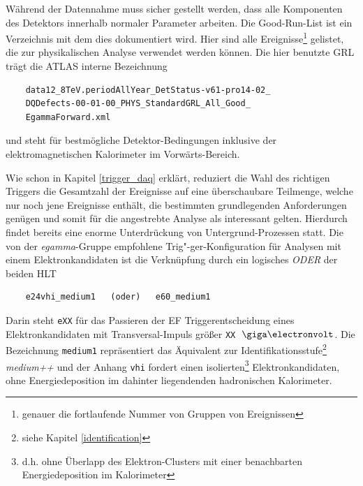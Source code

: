 \begin{description}
        Während der Datennahme muss sicher gestellt werden, dass alle
        Komponenten des Detektors innerhalb normaler Parameter arbeiten. Die
        Good-Run-List ist ein Verzeichnis mit dem dies dokumentiert wird. Hier
        sind alle Ereignisse\footnote{genauer die fortlaufende Nummer von
        Gruppen von Ereignissen} gelistet, die zur physikalischen Analyse
        verwendet werden können. Die hier benutzte \ac{GRL} trägt die ATLAS
        interne Bezeichnung
        \begin{verbatim}
    data12_8TeV.periodAllYear_DetStatus-v61-pro14-02_
    DQDefects-00-01-00_PHYS_StandardGRL_All_Good_
    EgammaForward.xml \end{verbatim}
        und steht für bestmögliche Detektor-Bedingungen inklusive der
        elektromagnetischen Kalorimeter im Vorwärts-Bereich.

\pagebreak

        Wie schon in Kapitel \ref{trigger_daq} erklärt, reduziert die Wahl des
        richtigen Triggers die Gesamtzahl der Ereignisse auf eine überschaubare
        Teilmenge, welche nur noch jene Ereignisse enthält, die bestimmten
        grundlegenden Anforderungen genügen und somit für die angestrebte
        Analyse als interessant gelten. Hierdurch findet bereits eine enorme
        Unterdrückung von Untergrund-Prozessen statt. Die von der
        \textit{egamma}-Gruppe empfohlene Trig"-ger-Konfiguration für Analysen
        mit einem Elektronkandidaten ist die Verknüpfung durch ein logisches
        \emph{ODER} der beiden \acl{HLT}
        \begin{verbatim}
    e24vhi_medium1   (oder)   e60_medium1 \end{verbatim}
        Darin steht \texttt{eXX} für das Passieren der \acf{EF}
        Triggerentscheidung eines Elektronkandidaten mit Transversal-Impuls
        größer \texttt{XX} $\GeV$. Die Bezeichnung \texttt{medium1}
        repräsentiert das Äquivalent zur Identifikationsstufe\footnote{siehe
        Kapitel \ref{identification}} \textit{medium++} und der Anhang
        \texttt{vhi} fordert einen isolierten\footnote{d.h. ohne Überlapp des
        Elektron-Clusters mit einer benachbarten Energiedeposition im
        Kalorimeter} Elektronkandidaten, ohne Energiedeposition im dahinter
        liegendenden hadronischen Kalorimeter.


\end{description}
